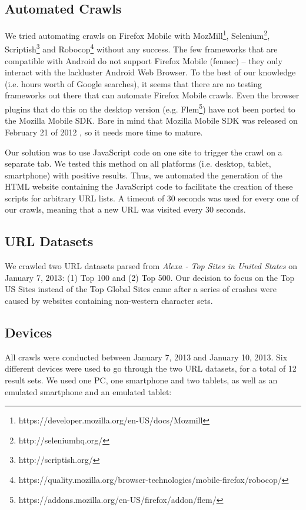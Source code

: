 \documentclass{acm_proc_article-sp}
\begin{document}
\subsection{Automated Crawls}

We tried automating crawls on Firefox Mobile with MozMill\footnote{https://developer.mozilla.org/en-US/docs/Mozmill}, Selenium\footnote{http://seleniumhq.org/}, Scriptish\footnote{http://scriptish.org/} and Robocop\footnote{https://quality.mozilla.org/browser-technologies/mobile-firefox/robocop/} without any success. The few frameworks that are compatible with Android do not support Firefox Mobile (fennec) -- they only interact with the lackluster Android Web Browser. To the best of our knowledge (i.e. hours worth of Google searches), it seems that there are no testing frameworks out there that can automate Firefox Mobile crawls. Even the browser plugins that do this on the desktop version (e.g. Flem\footnote{https://addons.mozilla.org/en-US/firefox/addon/flem/}) have not been ported to the Mozilla Mobile SDK. Bare in mind that Mozilla Mobile SDK was released on February 21 of 2012 \cite{announcing_sdk}, so it needs more time to mature.

Our solution was to use JavaScript code on one site to trigger the crawl on a separate tab. We tested this method on all platforms (i.e. desktop, tablet, smartphone) with positive results. Thus, we automated the generation of the HTML website containing the JavaScript code to facilitate the creation of these scripts for arbitrary URL lists. A timeout of 30 seconds was used for every one of our crawls, meaning that a new URL was visited every 30 seconds.

\subsection{URL Datasets}

We crawled two URL datasets parsed from \emph{Alexa - Top Sites in United States} on January 7, 2013: (1) Top 100 and (2) Top 500. Our decision to focus on the Top US Sites instead of the Top Global Sites came after a series of crashes were caused by websites containing non-western character sets.

\subsection{Devices}

All crawls were conducted between January 7, 2013 and January 10, 2013. Six different devices were used to go through the two URL datasets, for a total of 12 result sets. We used one PC, one smartphone and two tablets, as well as an emulated smartphone and an emulated tablet:
\end{document}

